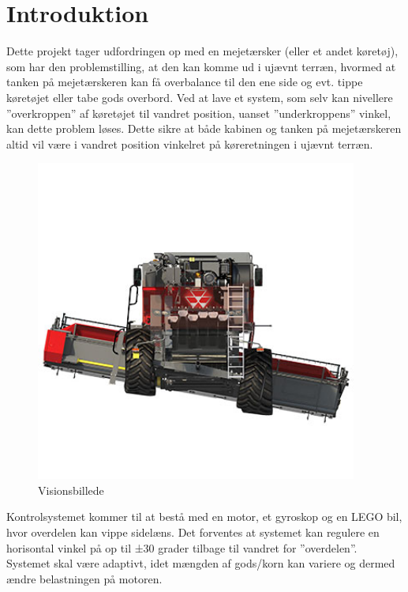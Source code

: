 \section{Introduktion}

Dette projekt tager udfordringen op med en mejetærsker (eller et andet køretøj), som har den problemstilling, at den kan komme ud i ujævnt terræn, hvormed at tanken på mejetærskeren kan få overbalance til den ene side og evt. tippe køretøjet eller tabe gods overbord. Ved at lave et system, som selv kan nivellere ”overkroppen” af køretøjet til vandret position, uanset ”underkroppens” vinkel, kan dette problem løses. Dette sikre at både kabinen og tanken på mejetærskeren altid vil være i vandret position vinkelret på køreretningen i ujævnt terræn.

\begin{figure}[H]
	\centering
	\includegraphics[width = 300pt]{figur/Visionbillede}
	\caption{Visionsbillede}
	\label{fig:konceptbillede}
\end{figure}

Kontrolsystemet kommer til at bestå med en motor, et gyroskop og en LEGO bil, hvor overdelen kan vippe sidelæns. Det forventes at systemet kan regulere en horisontal vinkel på op til ±30 grader tilbage til vandret for ”overdelen”. Systemet skal være adaptivt, idet mængden af gods/korn kan variere og dermed ændre belastningen på motoren.   \\ 

